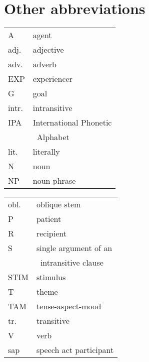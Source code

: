 \section*{Other abbreviations}

{%
	\setlength{\linewidth}{240mm}
	
	\begin{multicols}{2}
		\begin{tabular}{lp{4.25cm}}
			A 		&	agent\\
			adj. 		&	adjective\\
			adv. 		&	adverb\\
			EXP 		&	experiencer\\
			G 		&	goal\\
			intr. 		&	intransitive\\
			IPA 		&	International Phonetic\\
			{}		&	~Alphabet\\
			lit. 		&	literally\\
			N 		&	noun\\
			NP 		&	noun phrase\\
		\end{tabular}
		\begin{tabular}{lp{4.25cm}}
			obl. 		&	oblique stem\\
			P 		&	patient\\
			R 		&	recipient\\
			S 		&	single argument of an\\
			{}		&	~intransitive clause\\
			STIM 		&	stimulus\\
			T 		&	theme\\
			TAM 		&	tense-aspect-mood\\
			tr. 		&	transitive\\
			V 		&	verb\\
			sap 		&	speech act participant\\
		\end{tabular}
	\end{multicols}
}

